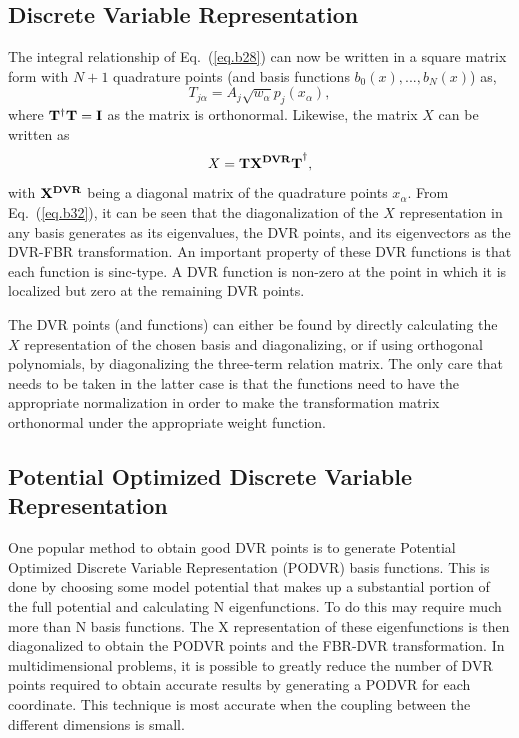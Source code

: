 {\subsection{Discrete Variable Representation}
The integral relationship of Eq.~(\ref{eq.b28}) can now be written in a square matrix form with $N+1$ quadrature points (and basis functions $b_0 \left(x\right),..., b_N \left(x\right)$) as,
\begin{equation}\label{eq.b31}
T_{j \alpha} = A_j\sqrt{w_{\alpha}} p_j\left(x_{\alpha}\right),
\end{equation}
where $\bf{T}^{\dagger}T=I$ as the matrix is orthonormal.  Likewise, the matrix $X$ can be written as
\begin{equation}\label{eq.b32}
X= {{\bf  T}}  {{\bf X^{DVR} T}}^{\dagger} ,
\end{equation}
with ${{\bf X^{DVR}}}$ being a diagonal matrix of the quadrature points $x_{\alpha}$.  From Eq.~(\ref{eq.b32}), it can be seen that the diagonalization of the $X$ representation in any basis generates as its eigenvalues, the DVR points, and its eigenvectors as the DVR-FBR transformation.  An important property of these DVR functions is that each function is sinc-type.  A DVR function is non-zero at the point in which it is localized but zero at the remaining DVR points.

The DVR points (and functions) can either be found by directly calculating the $X$ representation of the chosen basis and diagonalizing, or if using orthogonal polynomials, by diagonalizing the three-term relation matrix.  The only care that needs to be taken in the latter case is that the functions need to have the appropriate normalization in order to make the transformation matrix orthonormal under the appropriate weight function.

\subsection{Potential Optimized Discrete Variable Representation}
One popular method to obtain good DVR points is to generate Potential Optimized Discrete Variable Representation (PODVR) basis functions\cite{Wei1992,Echave1992}.  This is done by choosing some model potential that makes up a substantial portion of the full potential and calculating N eigenfunctions.  To do this may require much more than N basis functions.  The X representation of these eigenfunctions is then diagonalized to obtain the PODVR points and the FBR-DVR transformation.  In multidimensional problems, it is possible to greatly reduce the number of DVR points required to obtain accurate results by generating a PODVR for each coordinate.  This technique is most accurate when the coupling between the different dimensions is small.

}
